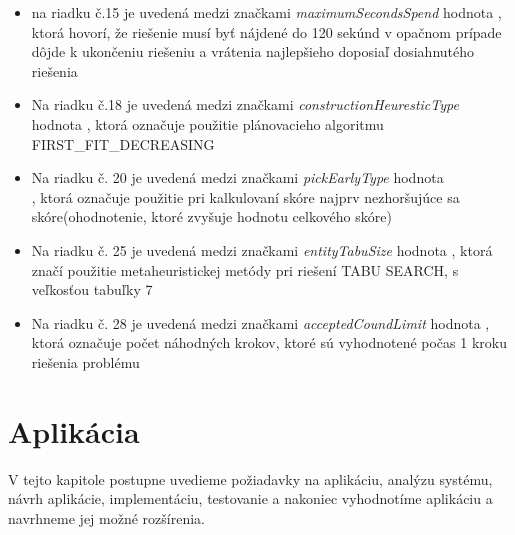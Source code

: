 \begin{itemize}
\item na riadku č.15 je uvedená medzi značkami \emph{maximumSecondsSpend} hodnota , ktorá hovorí, že riešenie musí byť nájdené do 120 sekúnd v opačnom prípade dôjde k ukončeniu riešeniu a vrátenia najlepšieho doposiaľ dosiahnutého riešenia
\item Na riadku č.18 je uvedená medzi značkami \emph{constructionHeuresticType} hodnota , ktorá označuje použitie plánovacieho algoritmu FIRST\_FIT\_DECREASING\cite{algibook}
\item Na riadku č. 20 je uvedená medzi značkami \emph{pickEarlyType} hodnota \\, ktorá označuje použitie pri kalkulovaní skóre najprv nezhoršujúce sa skóre(ohodnotenie, ktoré zvyšuje hodnotu celkového skóre)
\item Na riadku č. 25 je uvedená medzi značkami \emph{entityTabuSize} hodnota , ktorá značí použitie metaheuristickej metódy pri riešení TABU SEARCH\cite{algibook}, s veľkosťou tabuľky 7
\item Na riadku č. 28 je uvedená medzi značkami \emph{acceptedCoundLimit} hodnota , ktorá označuje počet náhodných krokov, ktoré sú vyhodnotené počas 1 kroku riešenia problému
\end{itemize}


\newpage


\chapter{Aplikácia}\label{impl}
V tejto kapitole postupne uvedieme požiadavky na aplikáciu, analýzu systému, návrh aplikácie, implementáciu, testovanie a nakoniec vyhodnotíme aplikáciu a navrhneme jej možné rozšírenia.

